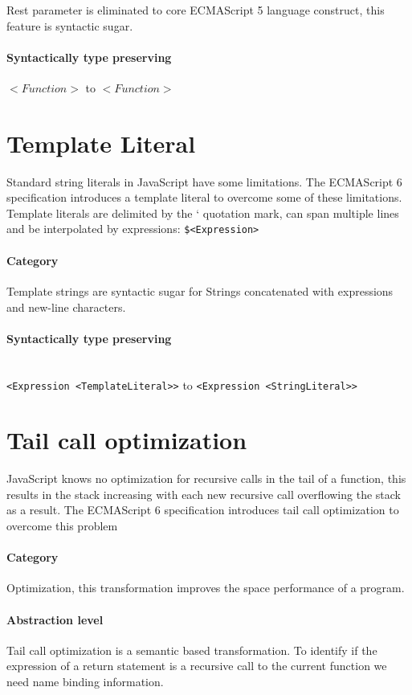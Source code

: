 Rest parameter is eliminated to core ECMAScript 5 language construct, this feature is syntactic sugar.

\paragraph{Syntactically type preserving}
$<Function>$ to $<Function>$

\section{Template Literal}
Standard string literals in JavaScript have some limitations. The ECMAScript 6 specification introduces a template literal to overcome some of these limitations\cite[12.2.8]{SpecJS}. Template literals are delimited by the ` quotation mark, can span multiple lines and be interpolated by expressions: \lstinline{$<Expression>}

\paragraph{Category}
Template strings are syntactic sugar for Strings concatenated with expressions and new-line characters.

\paragraph{Syntactically type preserving} \mbox{}\\
\lstinline$<Expression <TemplateLiteral>>$ to \lstinline$<Expression <StringLiteral>>$

\section{Tail call optimization} \label{tail-call-optimization}
JavaScript knows no optimization for recursive calls in the tail of a function, this results in the stack increasing with each new recursive call overflowing the stack as a result.  The ECMAScript 6 specification introduces tail call optimization to overcome this problem\cite[14.6]{SpecJS}

\paragraph{Category}
Optimization, this transformation improves the space performance of a program.

\paragraph{Abstraction level}
Tail call optimization is a semantic based transformation. To identify if the expression of a return statement is a recursive call to the current function we need name binding information.

